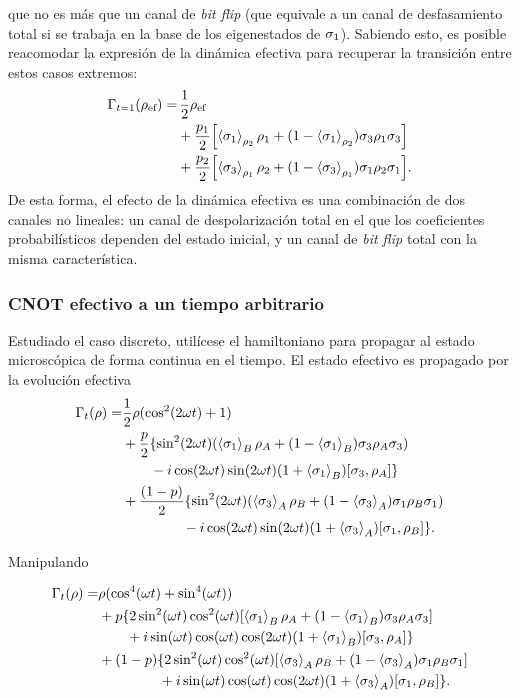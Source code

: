que no es más que un canal de \textit{bit flip} (que equivale a un canal de desfasamiento total si se trabaja en la base de los eigenestados de $\sigma_{1}$). Sabiendo esto, es posible reacomodar la expresión de la dinámica efectiva para recuperar la transición entre estos casos extremos:
\begin{align*}
  \Gamma_{t=1}(\rho_{\text{ef}})=&\,\frac{1}{2}\rho_{\text{ef}}\\
  &+\frac{p_{1}}{2}\qty[\expval{\sigma_{1}}_{\rho_{2}}\rho_{1}+(1-\expval{\sigma_{1}}_{\rho_{2}})\sigma_{3}\rho_{1}\sigma_{3}]\\
  &+\frac{p_{2}}{2}\qty[\expval{\sigma_{3}}_{\rho_{1}}\rho_{2}+(1-\expval{\sigma_{3}}_{\rho_{1}})\sigma_{1}\rho_{2}\sigma_{1}].
\end{align*}
De esta forma, el efecto de la dinámica efectiva es una combinación de dos canales no lineales: un canal de despolarización total en el que los coeficientes probabilísticos dependen del estado inicial, y un canal de \textit{bit flip} total con la misma característica. 

\subsubsection{CNOT efectivo a un tiempo arbitrario}

Estudiado el caso discreto, utilícese el hamiltoniano para propagar al estado microscópica de forma continua en el tiempo. El estado efectivo es propagado por la evolución efectiva
\begin{align*}
  \Gamma_{t}(\rho)=&\frac{1}{2}\rho(\cos^{2}(2\omega t)+1)\\
  &+\frac{p}{2}\{\sin^{2}(2\omega t)\qty(\expval{\sigma_{1}}_{B}\rho_{A}+(1-\expval{\sigma_{1}}_{B})\sigma_{3}\rho_{A}\sigma_{3})\\
  & \ \ \ \ \ \ -i\cos(2 \omega t)\sin(2 \omega t)(1+\expval{\sigma_{1}}_{B})[\sigma_{3},\rho_{A}]\}\\
  &+\frac{(1-p)}{2}\{\sin^{2}(2\omega t)\qty(\expval{\sigma_{3}}_{A}\rho_{B}+(1-\expval{\sigma_{3}}_{A})\sigma_{1}\rho_{B}\sigma_{1})\\
  &\ \ \ \ \ \ \ \ \ \ \ \ \ -i\cos(2 \omega t)\sin(2 \omega t)(1+\expval{\sigma_{3}}_{A})[\sigma_{1},\rho_{B}]\}.
\end{align*}

Manipulando

\begin{align*}
  \Gamma_{t}(\rho)=&\rho(\cos^{4}(\omega t)+\sin^{4}(\omega t))\\
  &+p\{2\sin^{2}(\omega t)\cos^{2}(\omega
  t)\qty[\expval{\sigma_{1}}_{B}\rho_{A}+(1-\expval{\sigma_{1}}_{B})\sigma_{3}\rho_{A}\sigma_{3}]\\
  & \ \ \ \ \ \ +i\sin(\omega t)\cos(\omega t)\cos(2\omega t)(1+\expval{\sigma_{1}}_{B})[\sigma_{3},\rho_{A}]\}\\
  &+(1-p)\{2\sin^{2}(\omega t)\cos^{2}(\omega t)\qty[\expval{\sigma_{3}}_{A}\rho_{B}+(1-\expval{\sigma_{3}}_{A})\sigma_{1}\rho_{B}\sigma_{1}]\\
  &\ \ \ \ \ \ \ \ \ \ \ \ \ +i\sin(\omega t)\cos(\omega t)\cos(2\omega t)(1+\expval{\sigma_{3}}_{A})[\sigma_{1},\rho_{B}]\}.
\end{align*} 


